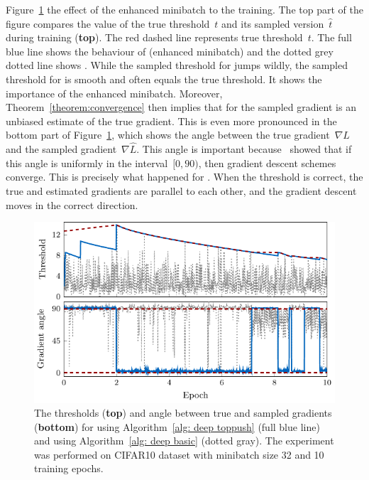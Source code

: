 Figure~\ref{fig:thresholds2} the effect of the enhanced minibatch to the training. The top part of the figure compares the value of the true threshold~$t$ and its sampled version~$\hat{t}$ during training (\textbf{top}). The red dashed line represents true threshold~$t.$ The full blue line shows the behaviour of \DeepTopPush (enhanced minibatch) and the dotted grey dotted line shows \TopPush. While the sampled threshold for \TopPush jumps wildly, the sampled threshold for \DeepTopPush is smooth and often equals the true threshold. It shows the importance of the enhanced minibatch. Moreover, Theorem~\ref{theorem:convergence} then implies that for \DeepTopPush the sampled gradient is an unbiased estimate of the true gradient. This is even more pronounced in the bottom part of Figure~\ref{fig:thresholds2}, which shows the angle between the true gradient~$\nabla L$ and the sampled gradient~$\nabla \hat{L}.$ This angle is important because~\cite{nocedal2006numerical} showed that if this angle is uniformly in the interval~$[0, 90)$, then gradient descent schemes converge. This is precisely what happened for \DeepTopPush. When the threshold is correct, the true and estimated gradients are parallel to each other, and the gradient descent moves in the correct direction.

\begin{figure}
  \centering
  \includegraphics{images/deep_thresholds.pdf}
  \caption{The thresholds (\textbf{top}) and angle between true and sampled gradients (\textbf{bottom}) for \DeepTopPush using Algorithm~\ref{alg: deep toppush} (full blue line) and \TopPush using Algorithm~\ref{alg: deep basic} (dotted gray). The experiment was performed on CIFAR10 dataset with minibatch size 32 and 10 training epochs.}
  \label{fig:thresholds2}
\end{figure}